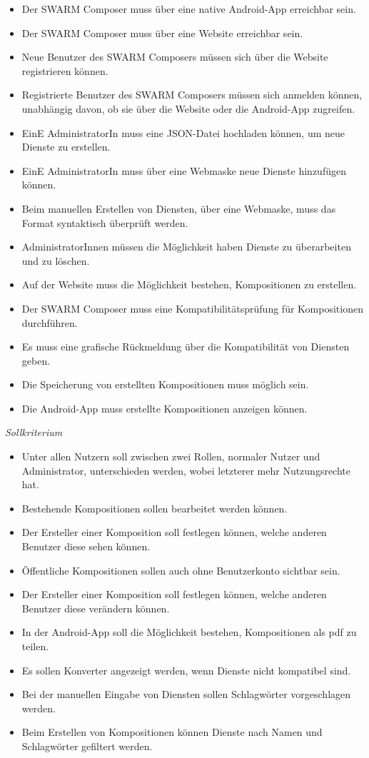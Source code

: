 \begin{itemize}[leftmargin=4pc]
	\item Der SWARM Composer muss über eine native Android-App erreichbar sein.
	\item Der SWARM Composer muss über eine Website erreichbar sein.
	\item Neue Benutzer des SWARM Composers müssen sich über die Website registrieren können.
	\item Registrierte Benutzer des SWARM Composers müssen sich anmelden können, unabhängig davon, ob sie über die Website oder die Android-App zugreifen.
	\item EinE AdministratorIn muss eine JSON-Datei hochladen können, um neue Dienste zu erstellen.
	\item EinE AdministratorIn muss über eine Webmaske neue Dienste hinzufügen können.
	\item Beim manuellen Erstellen von Diensten, über eine Webmaske, muss das Format syntaktisch überprüft werden.
	\item AdministratorInnen müssen die Möglichkeit haben Dienste zu überarbeiten und zu löschen.
	\item Auf der Website muss die Möglichkeit bestehen, Kompositionen zu erstellen.
	\item Der SWARM Composer muss eine Kompatibilitätsprüfung für Kompositionen durchführen.
	\item Es muss eine grafische Rückmeldung über die Kompatibilität von Diensten geben.
	\item Die Speicherung von erstellten Kompositionen muss möglich sein.
	\item Die Android-App muss erstellte Kompositionen anzeigen können.
\end{itemize}

\textit{Sollkriterium}

\begin{itemize}[leftmargin=4pc]
	\item Unter allen Nutzern soll zwischen zwei Rollen, normaler Nutzer und Administrator, unterschieden werden, wobei letzterer mehr Nutzungsrechte hat.
	\item Bestehende Kompositionen sollen bearbeitet werden können.
	\item Der Ersteller einer Komposition soll festlegen können, welche anderen Benutzer diese sehen können.
	\item Öffentliche Kompositionen sollen auch ohne Benutzerkonto sichtbar sein.
	\item Der Ersteller einer Komposition soll festlegen können, welche anderen Benutzer diese verändern können.
	\item In der Android-App soll die Möglichkeit bestehen, Kompositionen als pdf zu teilen.
	\item Es sollen Konverter angezeigt werden, wenn Dienste nicht kompatibel sind.
	\item Bei der manuellen Eingabe von Diensten sollen Schlagwörter vorgeschlagen werden.
	\item Beim Erstellen von Kompositionen können Dienste nach Namen und Schlagwörter gefiltert werden.
\end{itemize}

